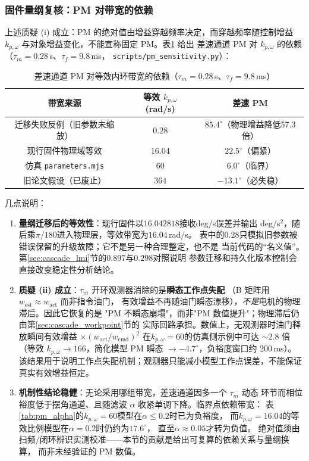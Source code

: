 \subsubsection{固件量纲复核：PM 对带宽的依赖}

上述质疑 (i) 成立：PM 的绝对值由增益穿越频率决定，而穿越频率随控制增益
$k_{p,\omega}$ 与对象增益变化，不能宣称固定 PM。表\ref{tab:pm_K_dep} 给出
差速通道 PM 对 $k_{p,\omega}$ 的依赖（$\tau_m=0.28$\,s、$\tau_f=9.8$\,ms，
\texttt{scripts/pm\_sensitivity.py}）：
\begin{table}[htbp]
\centering
\caption{差速通道 PM 对等效内环带宽的依赖（$\tau_m=0.28$\,s、$\tau_f=9.8$\,ms）}
\label{tab:pm_K_dep}
\begin{tabular}{ccc}
\hline
带宽来源 & 等效 $k_{p,\omega}$ (rad/s) & 差速 PM \\
\hline
迁移失败反例（旧参数未缩放） & $0.28$ & $85.4^\circ$（物理增益降低57.3倍） \\
现行固件物理域等效 & $16.04$ & $22.5^\circ$（偏紧） \\
仿真 \texttt{parameters.mjs} & $60$ & $6.0^\circ$（临界） \\
旧论文假设（已废止） & $364$ & $-13.1^\circ$（必失稳） \\
\hline
\end{tabular}
\end{table}

几点说明：
\begin{enumerate}
  \item \textbf{量纲迁移后的等效性}：现行固件以$16.042818$接收deg/s误差并输出
        deg/s$^2$，随后乘$\pi/180$进入物理层，等效带宽为$16.04$\,rad/s。
        表中的$0.28$只模拟旧参数被错误保留的升级故障；它不是另一种合理整定，也不是
        当前代码的“名义值”。第\ref{sec:cascade_lmi}节的$0.897$与$0.298$对照说明
        参数迁移和持久化版本控制会直接改变稳定性分析结论。
  \item \textbf{质疑 (ii) 成立}：$\tau_m$ 开环观测器消除的是\textbf{瞬态工作点失配}
        （B 矩阵用 $w_{\mathrm{est}}\approx w_{\mathrm{act}}$ 而非指令油门，
        有效增益不再随油门瞬态漂移），\emph{不是}电机的物理滞后。因此它恢复的是
        "PM 不瞬态崩塌"，而非"PM 数值提升"；物理滞后仍由第\ref{sec:cascade_workpoint}节的
        实际回路承担。数值上，无观测器时油门释放瞬间有效增益 $\times(w_{\mathrm{act}}/w_{\mathrm{cmd}})^2$
        在$k_{p,\omega}=60$的仿真侧示例中可达 $\sim2.8$ 倍（等效
        $k_{p,\omega}\to166$，简化模型 PM 瞬态 $\to-4.7^\circ$，负裕度窗口约 200\,ms）。
        该结果用于说明工作点失配机制；观测器只能减小模型工作点误差，不能保证真实有效增益恒定。
  \item \textbf{机制性结论稳健}：无论采用哪组带宽，差速通道因多一个 $\tau_m$ 动态
        环节而相位裕度低于摆角通道、且随滤波 $\alpha$ 收紧单调下降。临界点依赖带宽：
        表\ref{tab:pm_alpha}的$k_{p,\omega}=60$模型在$\alpha\le0.2$时已为负裕度，
        而$k_{p,\omega}=16.04$的等效比例模型在$\alpha=0.2$时仍约为$17.6^\circ$，
        直至$\alpha\approx0.05$才转为负值。
        绝对值须由扫频/闭环辨识实测校准——本节的贡献是给出可复算的依赖关系与量纲换算，
        而非未经验证的 PM 数值。
\end{enumerate}

